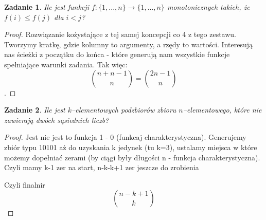 \documentclass{mwbk}
\newtheorem{zad}{Zadanie}[chapter]
\begin{document}
\begin{zad}
    Ile jest funkcji $f:\{1, ..., n\} \to \{1, ..., n\}$ monotonicznych takich,
    że $f(i) \leq f(j) $ dla $i < j$?
\end{zad}
\begin{proof}
    Rozwiązanie kożystające z tej samej koncepcji co 4 z tego zestawu.
    Tworzymy kratkę, gdzie kolumny to argumenty, a rzędy to wartości.
    Interesują nas ścieżki z początku do końca - które generują nam wszystkie funkcje
    spełniające warunki zadania. Tak więc:
    \[ \binom{n + n -1 }{n} = \binom{2n-1}{n} \].
\end{proof}


\begin{zad}
    Ile jest $k$--elementowych podzbiorów zbioru $n$--elementowego, które nie
    zawierają dwóch sąsiednich liczb?
\end{zad}
\begin{proof}
    Jest nie jest to funkcja 1 - 0 (funkcaj charakterystyczna). Generujemy
    zbiór typu 10101 aż do uzyskania k jedynek (tu k=3), ustalamy miejsca
    w które możemy dopełniać zerami (by ciągi były długości n - funkcja
    charakterystyczna). Czyli mamy k-1 zer na start, n-k-k+1 zer jeszcze do zrobienia


    Czyli finalnir
    \[\binom{n-k+1}{k}  \]
\end{proof}
\end{document}
